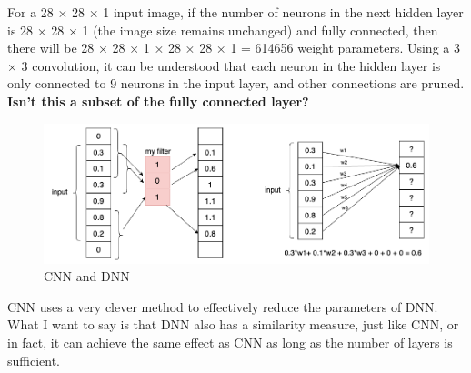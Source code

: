 \documentclass[oneside]{book}
\begin{document}
For a 28 × 28 × 1 input image, if the number of neurons in the next hidden layer is 28 × 28 × 1 (the image size remains unchanged) and fully connected, then there will be 28 × 28 × 1 × 28 × 28 × 1 = 614656 weight parameters.
Using a 3 × 3 convolution, it can be understood that each neuron in the hidden layer is only connected to 9 neurons in the input layer, and other connections are pruned. 
\textbf{Isn't this a subset of the fully connected layer?}
\begin{figure}[H]
        \centering
        \includegraphics[width=1.0\textwidth]{images/CNN and DNN.png}
        \caption{CNN and DNN}
\end{figure}
CNN uses a very clever method to effectively reduce the parameters of DNN.
What I want to say is that DNN also has a similarity measure, just like CNN, or in fact, it can achieve the same effect as CNN as long as the number of layers is sufficient.
\end{document}
